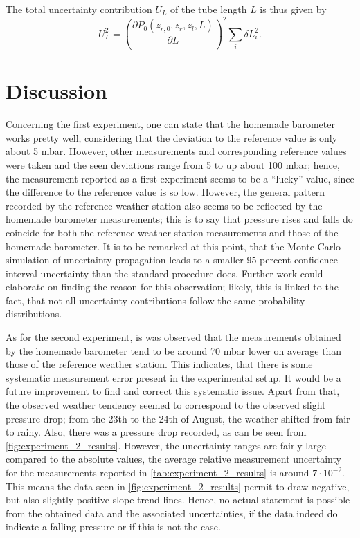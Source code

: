 \documentclass[a4paper,10pt, twocolumn]{article}
\begin{document}
The total uncertainty contribution $U_{L}$ of the tube length $L$ is thus given by \begin{equation}
	U_{L}^2 = \left(\frac{\partial P_0(z_{r,0}, z_r, z_l, L)}{\partial L}\right)^2\sum_{i}\delta L_{i}^2.
\end{equation}

\section{Discussion}
Concerning the first experiment, one can state that the homemade barometer works pretty well, considering that the deviation to the reference value is only about 5 mbar. However, other measurements and corresponding reference values were taken and the seen deviations range from 5 to up about 100 mbar; hence, the measurement reported as a first experiment seems to be a ``lucky'' value, since the difference to the reference value is so low. However, the general pattern recorded by the reference weather station also seems to be reflected by the homemade barometer measurements; this is to say that pressure rises and falls do coincide for both the reference weather station measurements and those of the homemade barometer. It is to be remarked at this point, that the Monte Carlo simulation of uncertainty propagation leads to a smaller 95 percent confidence interval uncertainty than the standard procedure does. Further work could elaborate on finding the reason for this observation; likely, this is linked to the fact, that not all uncertainty contributions follow the same probability distributions.

As for the second experiment, is was observed that the measurements obtained by the homemade barometer tend to be around 70 mbar lower on average than those of the reference weather station. This indicates, that there is some systematic measurement error present in the experimental setup. It would be a future improvement to find and correct this systematic issue. Apart from that, the observed weather tendency seemed to correspond to the observed slight pressure drop; from the 23th to the 24th of August, the weather shifted from fair to rainy. Also, there was a pressure drop recorded, as can be seen from \cref{fig:experiment_2_results}. However, the uncertainty ranges are fairly large compared to the absolute values, the average relative measurement uncertainty for the measurements reported in \cref{tab:experiment_2_results} is around $7\cdot 10^{-2}$. This means the data seen in \cref{fig:experiment_2_results} permit to draw negative, but also slightly positive slope trend lines. Hence, no actual statement is possible from the obtained data and the associated uncertainties, if the data indeed do indicate a falling pressure or if this is not the case.
\end{document}

